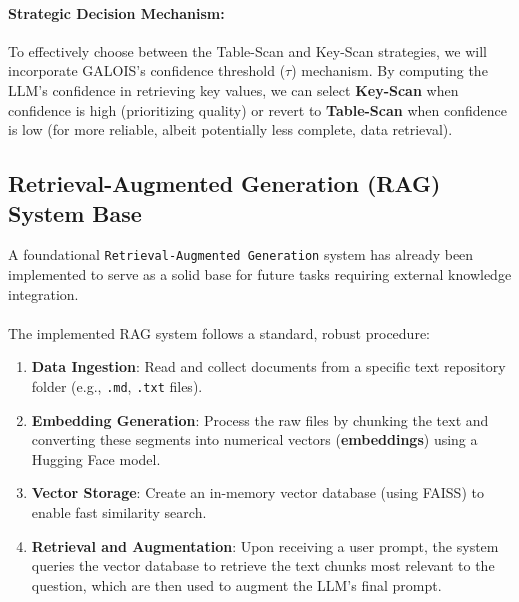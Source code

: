 \paragraph{\textbf{Strategic Decision Mechanism:}} To effectively choose between the Table-Scan and Key-Scan strategies, we will incorporate GALOIS's confidence threshold ($\tau$) mechanism. By computing the LLM's confidence in retrieving key values, we can select \textbf{Key-Scan} when confidence is high (prioritizing quality) or revert to \textbf{Table-Scan} when confidence is low (for more reliable, albeit potentially less complete, data retrieval).


\vspace{2em}
\subsection{Retrieval-Augmented Generation (RAG) System Base}

A foundational \texttt{Retrieval-Augmented Generation} system has already been implemented to serve as a solid base for future tasks requiring external knowledge integration.
\\\\
The implemented RAG system follows a standard, robust procedure:

\begin{enumerate}[leftmargin=*, label=\arabic*.]
    \item \textbf{Data Ingestion}: Read and collect documents from a specific text repository folder (e.g., \texttt{.md}, \texttt{.txt} files).
    \item \textbf{Embedding Generation}: Process the raw files by chunking the text and converting these segments into numerical vectors (\textbf{embeddings}) using a Hugging Face model.
    \item \textbf{Vector Storage}: Create an in-memory vector database (using FAISS) to enable fast similarity search.
    \item \textbf{Retrieval and Augmentation}: Upon receiving a user prompt, the system queries the vector database to retrieve the text chunks most relevant to the question, which are then used to augment the LLM's final prompt.
\end{enumerate}